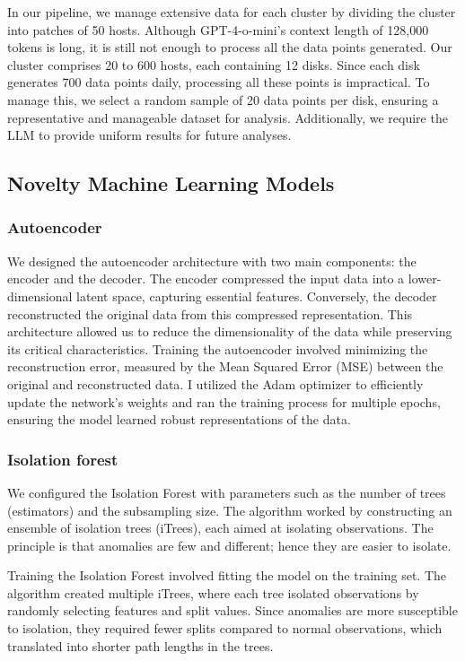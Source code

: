 \documentclass{article}
\begin{document}
\quad In our pipeline, we manage extensive data for each cluster by dividing the cluster into patches of 50 hosts. Although GPT-4-o-mini's context length of 128,000 tokens is long, it is still not enough to process all the data points generated. Our cluster comprises 20 to 600 hosts, each containing 12 disks. 
\quad Since each disk generates 700 data points daily, processing all these points is impractical. To manage this, we select a random sample of 20 data points per disk, ensuring a representative and manageable dataset for analysis. Additionally, we require the LLM to provide uniform results for future analyses.

\subsection{Novelty Machine Learning Models}

\subsubsection{Autoencoder}

\quad We designed the autoencoder architecture with two main components: the encoder and the decoder. The encoder compressed the input data into a lower-dimensional latent space, capturing essential features. Conversely, the decoder reconstructed the original data from this compressed representation. This architecture allowed us to reduce the dimensionality of the data while preserving its critical characteristics. 
\quad Training the autoencoder involved minimizing the reconstruction error, measured by the Mean Squared Error (MSE) between the original and reconstructed data. I utilized the Adam optimizer to efficiently update the network's weights and ran the training process for multiple epochs, ensuring the model learned robust representations of the data.

\subsubsection{Isolation forest}

\quad We configured the Isolation Forest with parameters such as the number of trees (estimators) and the subsampling size. The algorithm worked by constructing an ensemble of isolation trees (iTrees), each aimed at isolating observations. The principle is that anomalies are few and different; hence they are easier to isolate.

\quad Training the Isolation Forest involved fitting the model on the training set. The algorithm created multiple iTrees, where each tree isolated observations by randomly selecting features and split values. Since anomalies are more susceptible to isolation, they required fewer splits compared to normal observations, which translated into shorter path lengths in the trees.
\end{document}
